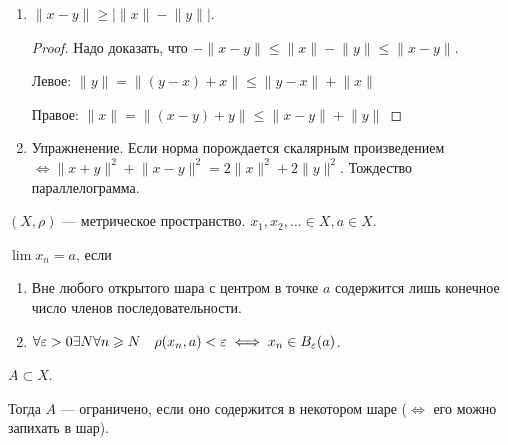 \begin{properties}
\begin{enumerate}
\begin{proof}
                 $\rho(y, x) = \lVert y-x \rVert = \lVert (-1)(x-y) \rVert = |-1| \lVert x - y \rVert = \rho(x, y)$.

                  $\rho(x, z) \le \rho(x, y) + \rho(y, z)$: $\lVert (x-y) + (y-z) \rVert = \lVert x-z\rVert \le \lVert x - y \rVert + \lVert y-z \rVert$.
            \end{proof}
        \item $\lVert x - y \rVert \ge |\lVert x \rVert - \lVert y \rVert |$.
            \begin{proof}
                Надо доказать, что $-\lVert x - y \rVert \le \lVert x \rVert - \lVert y \rVert \le \lVert x - y \rVert$.

                Левое: $\lVert y \rVert = \lVert (y - x) + x \rVert \le \lVert y - x \rVert + \lVert x \rVert$

                Правое: $\lVert x \rVert = \lVert (x - y) + y \rVert \le \lVert x - y \rVert + \lVert y \rVert$

            \end{proof}
        \item Упражненение. Если норма порождается скалярным произведением $\iff \lVert x+y\rVert^2 + \lVert x-y\rVert^2 = 2\lVert x\rVert^2 + 2\lVert y \rVert^2$. Тождество параллелограмма.
    \end{enumerate}
\end{properties}
\begin{definition}
    $(X, \rho)$ --- метрическое пространство.  $x_1, x_2, \ldots \in X, a \in X$.

    $\lim x_n = a$, если
     \begin{enumerate}
         \item Вне любого открытого шара с центром в точке  $a$ содержится лишь конечное число членов последовательности.
         \item  $\forall \varepsilon > 0 \exists N \forall n \geqslant N\quad \rho(x_n, a) < \varepsilon \iff x_n \in B_\varepsilon(a)$.
    \end{enumerate}
\end{definition}
\begin{definition}
    $A \subset X$. 

    Тогда  $A$ --- ограничено, если оно содержится в некотором шаре ($\iff$ его можно запихать в шар).
\end{definition}
